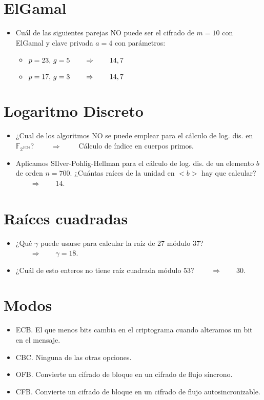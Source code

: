 \documentclass[fleqn]{article}
\def\F{\mathds{F}}
\def\next{\qquad \Rightarrow \qquad}
\begin{document}
    \section{ElGamal}
    \begin{itemize}
        \item Cuál de las siguientes parejas NO puede ser el cifrado de $m = 10$ con ElGamal y clave privada $a = 4$ con parámetros:
                \begin{itemize}
                    \item $p = 23, \thinspace g = 5 \next 14,7$
                    \item $p = 17, \thinspace g = 3 \next 14,7$
                \end{itemize}
    \end{itemize}

    \section{Logaritmo Discreto}
    \begin{itemize}
        \item ¿Cual de los algoritmos NO se puede emplear para el cálculo de log. dis. en $\F_{2^{1024}}$? $\next $ Cálculo de índice en cuerpos primos.
        \item Aplicamos SIlver-Pohlig-Hellman para el cálculo de log. dis. de un elemento $b$ de orden $n = 700$. ¿Cuántas raíces de la unidad en $<b>$ hay que calcular? $\next 14$.
    \end{itemize}

    \section{Raíces cuadradas}
    \begin{itemize}
        \item ¿Qué $\gamma$ puede usarse para calcular la raíz de 27 módulo 37? $\next \gamma = 18$. 
        \item ¿Cuál de esto enteros no tiene raíz cuadrada módulo 53? $\next 30$.
    \end{itemize}

    \section{Modos}
    \begin{itemize}
        \item ECB. El que menos bits cambia en el criptograma cuando alteramos un bit en el mensaje.
        \item CBC. Ninguna de las otras opciones.
        \item OFB. Convierte un cifrado de bloque en un cifrado de flujo síncrono.
        \item CFB. Convierte un cifrado de bloque en un cifrado de flujo autosincronizable.
    \end{itemize}
\end{document}
